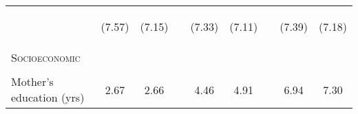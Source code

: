 \documentclass{article}[11pt,subeqn]
\begin{document}
\begin{spacing}{1.5}
\begin{table}[ht]
\begin{center}
\begin{tabular}{lccp{5mm}ccp{5mm}cc}
\begin{footnotesize}\end{footnotesize}	& \begin{footnotesize} (7.57)\end{footnotesize} & \begin{footnotesize} (7.15)\end{footnotesize} & \begin{footnotesize} 	\end{footnotesize} & \begin{footnotesize} (7.33)\end{footnotesize} & \begin{footnotesize} (7.11)\end{footnotesize} & \begin{footnotesize} 	\end{footnotesize} & \begin{footnotesize} (7.39)\end{footnotesize} & \begin{footnotesize} (7.18)\end{footnotesize}	\\
\textsc{Socioeconomic} & & &&&&&& \\																
\begin{footnotesize}\end{footnotesize}	&	\begin{footnotesize}\end{footnotesize}	&	\begin{footnotesize}\end{footnotesize}	&	\begin{footnotesize}\end{footnotesize} &	\begin{footnotesize}\end{footnotesize}	&	\begin{footnotesize}\end{footnotesize}	&	\begin{footnotesize}\end{footnotesize} &	\begin{footnotesize}\end{footnotesize}	&	\begin{footnotesize}\end{footnotesize}		\\
Mother's education (yrs)	&	2.67	&	2.66	&	&	4.46	&	4.91	&	&	6.94	&	7.30		\\

\end{tabular}
\end{center}
\end{table}
\end{spacing}
\end{document}

